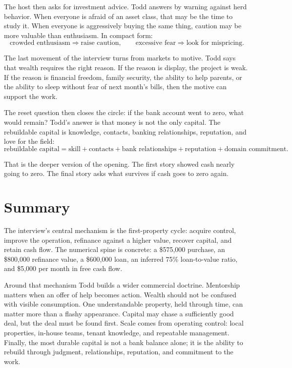 The host then asks for investment advice. Todd answers by warning against herd behavior. When everyone is afraid of an asset class, that may be the time to study it. When everyone is aggressively buying the same thing, caution may be more valuable than enthusiasm. In compact form:
\begin{equation}
\text{crowded enthusiasm} \Rightarrow \text{raise caution},
\qquad
\text{excessive fear} \Rightarrow \text{look for mispricing}.
\end{equation}

The last movement of the interview turns from markets to motive. Todd says that wealth requires the right reason. If the reason is display, the project is weak. If the reason is financial freedom, family security, the ability to help parents, or the ability to sleep without fear of next month's bills, then the motive can support the work.

The reset question then closes the circle: if the bank account went to zero, what would remain? Todd's answer is that money is not the only capital. The rebuildable capital is knowledge, contacts, banking relationships, reputation, and love for the field:
\begin{equation}
\text{rebuildable capital}
=
\text{skill}
+
\text{contacts}
+
\text{bank relationships}
+
\text{reputation}
+
\text{domain commitment}.
\end{equation}

That is the deeper version of the opening. The first story showed cash nearly going to zero. The final story asks what survives if cash goes to zero again.

\section{Summary}

The interview's central mechanism is the first-property cycle: acquire control, improve the operation, refinance against a higher value, recover capital, and retain cash flow. The numerical spine is concrete: a \$575,000 purchase, an \$800,000 refinance value, a \$600,000 loan, an inferred 75\% loan-to-value ratio, and \$5,000 per month in free cash flow.

Around that mechanism Todd builds a wider commercial doctrine. Mentorship matters when an offer of help becomes action. Wealth should not be confused with visible consumption. One understandable property, held through time, can matter more than a flashy appearance. Capital may chase a sufficiently good deal, but the deal must be found first. Scale comes from operating control: local properties, in-house teams, tenant knowledge, and repeatable management. Finally, the most durable capital is not a bank balance alone; it is the ability to rebuild through judgment, relationships, reputation, and commitment to the work.